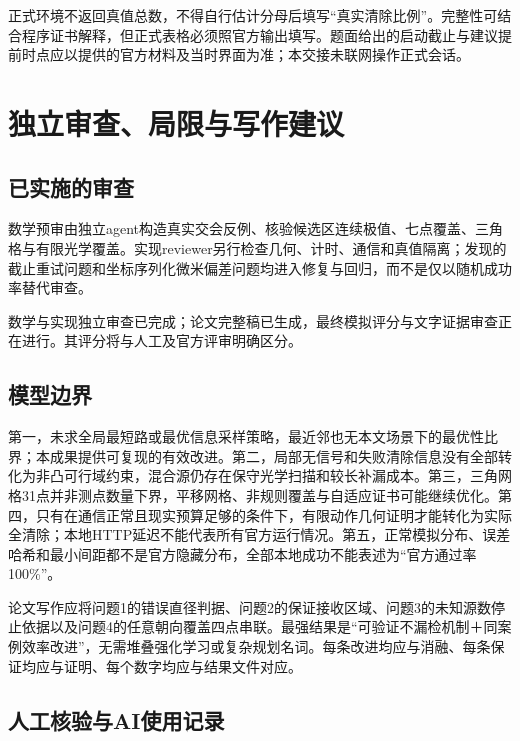 \documentclass[
  chinese,
  UTF8,
  a4paper,
  zihao=-4]{ctexart}
\begin{document}
正式环境不返回真值总数，不得自行估计分母后填写``真实清除比例''。完整性可结合程序证书解释，但正式表格必须照官方输出填写。题面给出的启动截止与建议提前时点应以提供的官方材料及当时界面为准；本交接未联网操作正式会话。

\section{独立审查、局限与写作建议}\label{ux72ecux7acbux5ba1ux67e5ux5c40ux9650ux4e0eux5199ux4f5cux5efaux8bae}

\subsection{已实施的审查}\label{ux5df2ux5b9eux65bdux7684ux5ba1ux67e5}

数学预审由独立agent构造真实交会反例、核验候选区连续极值、七点覆盖、三角格与有限光学覆盖。实现reviewer另行检查几何、计时、通信和真值隔离；发现的截止重试问题和坐标序列化微米偏差问题均进入修复与回归，而不是仅以随机成功率替代审查。

数学与实现独立审查已完成；论文完整稿已生成，最终模拟评分与文字证据审查正在进行。其评分将与人工及官方评审明确区分。

\subsection{模型边界}\label{ux6a21ux578bux8fb9ux754c}

第一，未求全局最短路或最优信息采样策略，最近邻也无本文场景下的最优性比界；本成果提供可复现的有效改进。第二，局部无信号和失败清除信息没有全部转化为非凸可行域约束，混合源仍存在保守光学扫描和较长补漏成本。第三，三角网格31点并非测点数量下界，平移网格、非规则覆盖与自适应证书可能继续优化。第四，只有在通信正常且现实预算足够的条件下，有限动作几何证明才能转化为实际全清除；本地HTTP延迟不能代表所有官方运行情况。第五，正常模拟分布、误差哈希和最小间距都不是官方隐藏分布，全部本地成功不能表述为``官方通过率100\%''。

论文写作应将问题1的错误直径判据、问题2的保证接收区域、问题3的未知源数停止依据以及问题4的任意朝向覆盖四点串联。最强结果是``可验证不漏检机制＋同案例效率改进''，无需堆叠强化学习或复杂规划名词。每条改进均应与消融、每条保证均应与证明、每个数字均应与结果文件对应。

\subsection{人工核验与AI使用记录}\label{ux4ebaux5de5ux6838ux9a8cux4e0eaiux4f7fux7528ux8bb0ux5f55}
\end{document}
